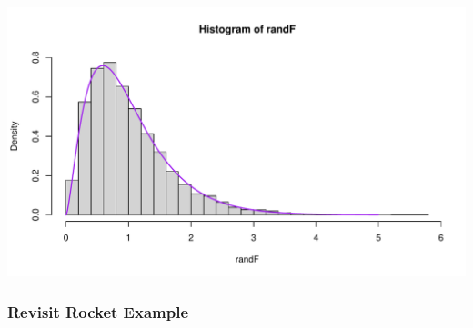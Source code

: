 \documentclass[oneside]{book}\usepackage[]{graphicx}\usepackage[dvipsnames,table,xcdraw]{xcolor}
\makeatletter
\def\maxwidth{ %
  \ifdim\Gin@nat@width>\linewidth
    \linewidth
  \else
    \Gin@nat@width
  \fi
}
\newenvironment{knitrout}{}{} %
\makeatother
\begin{document}
\begin{knitrout}
{\centering \includegraphics[width=\maxwidth]{figure/unnamed-chunk-35-4} 

}


\end{knitrout}

\subsubsection{Revisit Rocket Example}
\end{document}
